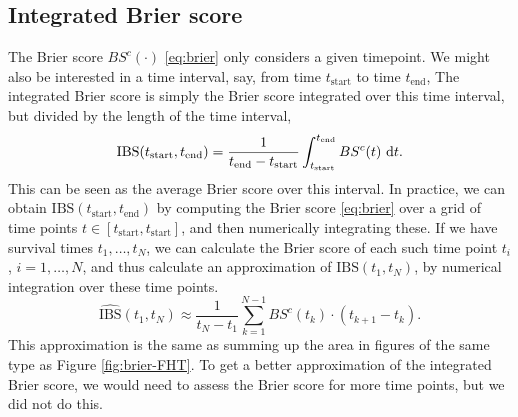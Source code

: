 \subsection{Integrated Brier score}\label{subsec:integrated-brier}
The Brier score $BS^c(\cdot)$ \eqref{eq:brier} only considers a given timepoint.
We might also be interested in a time interval, say, from time $t_{\text{start}}$ to time $t_{\text{end}}$, 
The integrated Brier score is simply the Brier score integrated over this time interval, but divided by the length of the time interval,
\begin{equation*}
    \text{IBS}(t_{\text{start}}, t_{\text{end}})=\frac{1}{t_{\text{end}}-t_{\text{start}}}\int_{t_{\text{start}}}^{t_{\text{end}}}BS^c(t)~\text{d} t.
\end{equation*}
This can be seen as the average Brier score over this interval.
In practice, we can obtain $\text{IBS}(t_{\text{start}},t_{\text{end}})$ by computing the Brier score \ref{eq:brier} over a grid of time points $t\in[t_{\text{start}},t_{\text{start}}]$, and then numerically integrating these.
If we have survival times $t_1,\ldots,t_N$, we can calculate the Brier score of each such time point $t_i$, $i=1,\ldots,N$, and thus calculate an approximation of $\text{IBS}(t_1,t_N)$, by numerical integration over these time points.
\begin{equation*}
    \widehat{\text{IBS}}(t_1, t_N)\approx\frac{1}{t_N-t_1}\sum_{k=1}^{N-1} BS^c(t_k)\cdot(t_{k+1}-t_{k}).
\end{equation*}
This approximation is the same as summing up the area in figures of the same type as Figure \ref{fig:brier-FHT}.
To get a better approximation of the integrated Brier score, we would need to assess the Brier score for more time points, but we did not do this.